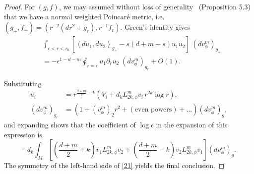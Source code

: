 \documentclass{amsart}
\begin{document}
\begin{proof}
For $(g,f)$, we may assumed without loss of generality~{\cites{CaseKhaitan2022} (Proposition 5.3)} that we have a normal weighted Poincar\'e metric, i.e. $(g_+,f_+)=(r^{-2}(dr^2+g_r),r^{-1}f_r)$. Green's identity gives
\begin{align*}
&\int_{\epsilon<r<r_{0}}\left[\left\langle d u_{1}, d u_{2}\right\rangle_{g_+}-s(d+m-s) u_{1} {u_{2}}\right] \;(d v_\phi^m)_{g_{+}} \\
&=-\epsilon^{1-d-m} \oint_{r=\epsilon} u_{1} \partial_{r} {u_{2}} \;(d v_\phi^m)_{g_{r}}+O(1).
\end{align*}

Substituting
\begin{align*}
u_i&=r^{\frac{d+m}{2}-k}\left(V_i+d_k L_{2k,\phi}^m v_i \,r^{2 k} \log r\right),\\
(d v_\phi^m)_{g_{r}}&=\left(1+(v_\phi^m)_2 r^{2}+(\text {even powers})+\ldots\right) (d v_\phi^m)_{g},
\end{align*}
and expanding shows that the coefficient of $\log \epsilon$ in the expansion of this expression is
$$
-d_k\int_{M}\left[\left(\frac{d+m}{2}+k\right) v_{1} { L_{2k,\phi}^m v_2}+\left(\frac{d+m}{2}-k\right) {v_{2}} L_{2k,\phi}^m v_1 \right] (d v_\phi^m)_{g}.
$$
The symmetry of the left-hand side of \cref{21} yields the final conclusion.
\end{proof}


\end{document}
